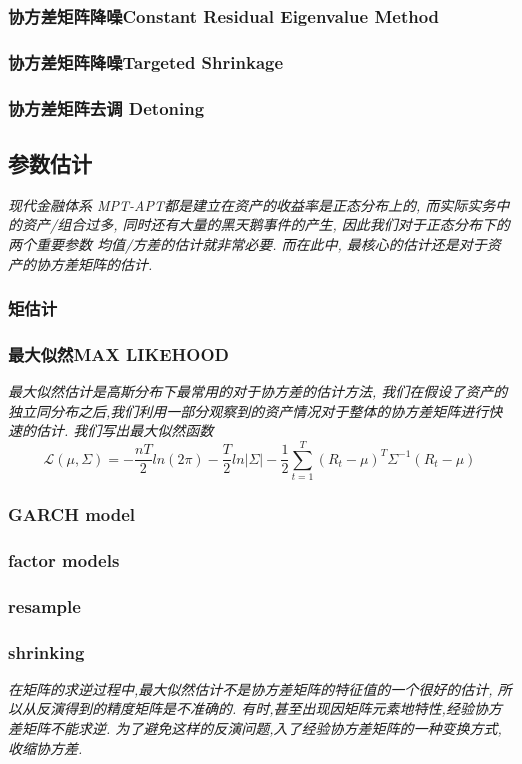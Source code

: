 \documentclass{scrartcl}
\numberwithin{equation}{section}   %
\begin{document}
\subsubsection{协方差矩阵降噪Constant Residual Eigenvalue Method}
\subsubsection{协方差矩阵降噪Targeted Shrinkage}

\subsubsection{协方差矩阵去调 Detoning}



\subsection{参数估计}
\textsl{现代金融体系 MPT-APT都是建立在资产的收益率是正态分布上的, 而实际实务中的资产/组合过多, 同时还有大量的黑天鹅事件的产生, 因此我们对于正态分布下的两个重要参数 均值/方差的估计就非常必要. 而在此中, 最核心的估计还是对于资产的协方差矩阵的估计.}
\subsubsection{矩估计}
\subsubsection{最大似然MAX LIKEHOOD}
\textsl{最大似然估计是高斯分布下最常用的对于协方差的估计方法, 我们在假设了资产的独立同分布之后,我们利用一部分观察到的资产情况对于整体的协方差矩阵进行快速的估计. 我们写出最大似然函数 }
$$\mathcal{L}(\mu, \Sigma) = -\frac{nT}{2}ln(2\pi) - \frac{T}{2} ln|\Sigma| - \frac{1}{2} \sum_{t=1}^T (R_t -\mu)^T\Sigma^{-1}(R_t -\mu)$$



\subsubsection{ GARCH model }
\subsubsection{ factor models}

\subsubsection{resample}
\subsubsection{ shrinking }
\textsl{
    在矩阵的求逆过程中,最大似然估计不是协方差矩阵的特征值的一个很好的估计, 所以从反演得到的精度矩阵是不准确的. 有时,甚至出现因矩阵元素地特性,经验协方差矩阵不能求逆. 为了避免这样的反演问题,入了经验协方差矩阵的一种变换方式,收缩协方差.
}
\end{document}
